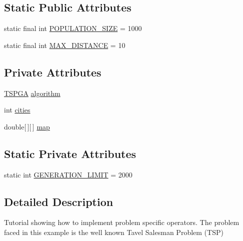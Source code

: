 \subsection*{Static Public Attributes}
\begin{DoxyCompactItemize}
\item 
static final int \hyperlink{classjenes_1_1tutorials_1_1old_1_1problem3_1_1_travel_salesman_problem_a388d4fcbb82c911c4646c5de782f4d59}{P\-O\-P\-U\-L\-A\-T\-I\-O\-N\-\_\-\-S\-I\-Z\-E} = 1000
\item 
static final int \hyperlink{classjenes_1_1tutorials_1_1old_1_1problem3_1_1_travel_salesman_problem_a5f210d5ce4eb968b6c8e62b2c5d1a93a}{M\-A\-X\-\_\-\-D\-I\-S\-T\-A\-N\-C\-E} = 10
\end{DoxyCompactItemize}
\subsection*{Private Attributes}
\begin{DoxyCompactItemize}
\item 
\hyperlink{classjenes_1_1tutorials_1_1old_1_1problem3_1_1_t_s_p_g_a}{T\-S\-P\-G\-A} \hyperlink{classjenes_1_1tutorials_1_1old_1_1problem3_1_1_travel_salesman_problem_a5733f9e85db22c0787784b7a2a943175}{algorithm}
\item 
int \hyperlink{classjenes_1_1tutorials_1_1old_1_1problem3_1_1_travel_salesman_problem_a244d5923b96b3392663fc531fd792348}{cities}
\item 
double\mbox{[}$\,$\mbox{]}\mbox{[}$\,$\mbox{]} \hyperlink{classjenes_1_1tutorials_1_1old_1_1problem3_1_1_travel_salesman_problem_a165e6f4b71c61f5a07ba3b6e0aae1855}{map}
\end{DoxyCompactItemize}
\subsection*{Static Private Attributes}
\begin{DoxyCompactItemize}
\item 
static int \hyperlink{classjenes_1_1tutorials_1_1old_1_1problem3_1_1_travel_salesman_problem_a2ed71be7b99667312c0945e5375b6a42}{G\-E\-N\-E\-R\-A\-T\-I\-O\-N\-\_\-\-L\-I\-M\-I\-T} = 2000
\end{DoxyCompactItemize}


\subsection{Detailed Description}
Tutorial showing how to implement problem specific operators. The problem faced in this example is the well known Tavel Salesman Problem (T\-S\-P)

